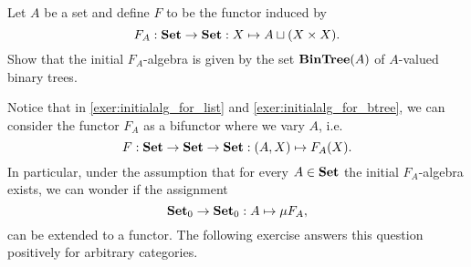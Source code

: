 %    
%
%    
%
%

\begin{exer}\label{exer:initialalg_for_btree} Let $A$ be a set and define $F$ to be the functor induced by 
\[
F_A:\mathbf{Set}\to\mathbf{Set} : X\mapsto A \sqcup (X\times X).
\]
Show that the initial $F_A$-algebra is given by the set $\mathbf{BinTree}(A)$ of $A$-valued binary trees.
\end{exer}

\begin{rem} Notice that in \cref{exer:initialalg_for_list} and \cref{exer:initialalg_for_btree}, we can consider the functor $F_A$ as a bifunctor where we vary $A$, i.e.
\[
F: \mathbf{Set}\to \mathbf{Set}\to \mathbf{Set}: (A,X)\mapsto F_A(X).
\]
In particular, under the assumption that for every $A\in\mathbf{Set}$ the initial $F_A$-algebra exists, we can wonder if the assignment 
\[
{\mathbf{Set}}_0 \to {\mathbf{Set}}_0 : A\mapsto \mu F_A ,
\]
can be extended to a functor. The following exercise answers this question positively for arbitrary categories.
\end{rem}

